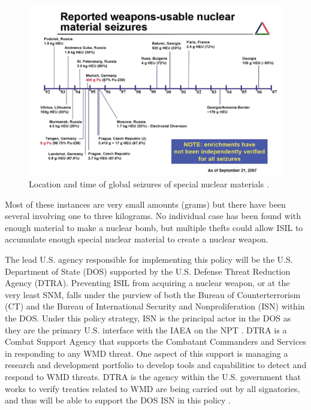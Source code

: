 \documentclass{report}
\begin{document}
\begin{figure}
 \centering
 \includegraphics[trim = 0cm 0cm 0cm 0cm, clip,scale=0.7]{./figures/seizures.png}
   \caption{Location and time of global seizures of special nuclear materials \cite{Muller2007}.}
     \label{fig:seizures}
\end{figure}


Most of these instances are very small amounts (grams) but there have been several involving one to three kilograms. No individual case has been found with enough material to make a nuclear bomb, but multiple thefts could allow ISIL to accumulate enough special nuclear material to create a nuclear weapon. 


The lead U.S. agency responsible for implementing this policy will be the U.S. Department of State (DOS) supported by the U.S. Defense Threat Reduction Agency (DTRA). Preventing ISIL from acquiring a nuclear weapon, or at the very least SNM, falls under the purview of both the Bureau of Counterterrorism (CT) and the Bureau of International Security and Nonproliferation (ISN) within the DOS. Under this policy strategy, ISN is the principal actor in the DOS as they are the primary U.S. interface with the IAEA on the NPT \cite{Circular1970}. DTRA is a Combat Support Agency that supports the Combatant Commanders and Services in responding to any WMD threat. One aspect of this support is managing a research and development portfolio to develop tools and capabilities to detect and respond to WMD threats. DTRA is the agency within the U.S. government that works to verify treaties related to WMD are being carried out by all signatories, and thus will be able to support the DOS ISN in this policy \cite{DefenseThreatReductionAgency}. 
\end{document}

